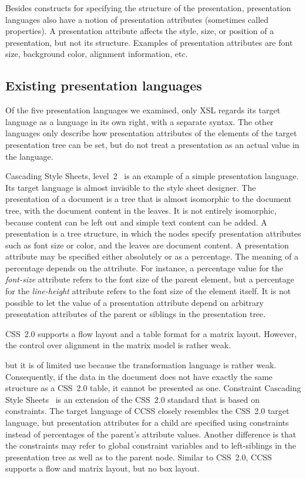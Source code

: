 Besides constructs for specifying the structure of the presentation, presentation languages also have a notion of presentation attributes (sometimes called properties). A presentation attribute affects the style, size, or position of a presentation, but not its structure. Examples of presentation attributes are font size, background color, alignment information, etc.


%																
\subsection{Existing presentation languages} \label{sect:existingtarget}

Of the five presentation languages we examined, only XSL regards its target language as a language in its own right, with a separate syntax. The other languages only describe how presentation attributes of the elements of the target presentation tree can be set, but do not treat a presentation as an actual value in the language.

 Cascading Style Sheets, level~2~\cite{css2} is an example of a simple presentation language. Its target language is almost invisible to the style sheet designer.  \bc The presentation of a document is a tree that is almost isomorphic to the document tree, with the document content in the leaves. It is not entirely isomorphic, because content can be left out and simple text content can be added.  \ec A presentation is a tree structure, in which the nodes specify presentation attributes such as font size or color, and the leaves are document content. A presentation attribute may be specified either absolutely or as a percentage. The meaning of a percentage depends on the attribute. For instance, a percentage value for the {\em font-size} attribute refers to the font size of the parent element, but a percentage for the {\em line-height} attribute refers to the font size of the element itself. It is not possible to let the value of a presentation attribute depend on arbitrary presentation attributes of the parent or siblings in the presentation tree.

CSS~2.0 supports a flow layout and a table format for a matrix layout. However, the control over alignment in the matrix model is rather weak.

\bc but it is of limited use because the transformation language is rather weak. Consequently, if the data in the document does not have exactly the same structure as a CSS~2.0 table, it cannot be presented as one.
\ec
{} Constraint Cascading Style Sheets~\cite{badros99ccss} is an extension of the CSS~2.0 standard that is based on constraints. The target language of CCSS closely resembles the CSS~2.0 target language, but presentation attributes for a child are specified using constraints instead of percentages of the parent's attribute values. Another difference is that the constraints may refer to global constraint variables and to left-siblings in the presentation tree as well as to the parent node. Similar to CSS~2.0, CCSS supports a flow and matrix layout, but no box layout.

